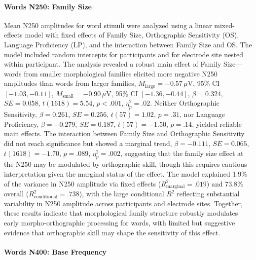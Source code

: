 \documentclass[utf8]{FrontiersinHarvard} %
\begin{document}
	\paragraph*{Words N250: Family Size}
	Mean N250 amplitudes for word stimuli were analyzed using a linear mixed-effects model with fixed effects of Family Size, Orthographic Sensitivity (OS), Language Proficiency (LP), and the interaction between Family Size and OS. The model included random intercepts for participants and for electrode site nested within participant. The analysis revealed a robust main effect of Family Size—words from smaller morphological families elicited more negative N250 amplitudes than words from larger families, $M_{\mathrm{large}} = -0.57\,\mu$V, 95\% CI $[-1.03, -0.11]$, $M_{\mathrm{small}} = -0.90\,\mu$V, 95\% CI $[-1.36, -0.44]$, $\beta = 0.324$, $SE = 0.058$, $t(1618) = 5.54$, $p < .001$, $\eta^2_p = .02$. Neither Orthographic Sensitivity, $\beta = 0.261$, $SE = 0.256$, $t(57) = 1.02$, $p = .31$, nor Language Proficiency, $\beta = -0.279$, $SE = 0.187$, $t(57) = -1.50$, $p = .14$, yielded reliable main effects. The interaction between Family Size and Orthographic Sensitivity did not reach significance but showed a marginal trend, $\beta = -0.111$, $SE = 0.065$, $t(1618) = -1.70$, $p = .089$, $\eta^2_p = .002$, suggesting that the family size effect at the N250 may be modulated by orthographic skill, though this requires cautious interpretation given the marginal status of the effect. The model explained 1.9\% of the variance in N250 amplitude via fixed effects ($R^2_{\mathrm{marginal}} = .019$) and 73.8\% overall ($R^2_{\mathrm{conditional}} = .738$), with the large conditional $R^2$ reflecting substantial variability in N250 amplitude across participants and electrode sites. Together, these results indicate that morphological family structure robustly modulates early morpho-orthographic processing for words, with limited but suggestive evidence that orthographic skill may shape the sensitivity of this effect.
	
	\paragraph*{Words N400: Base Frequency}
	
\end{document}
